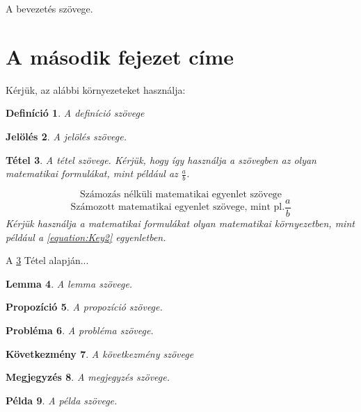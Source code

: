 \documentclass[a4paper,12pt]{article}
\newtheorem{theorem}{Tétel}[section]
\newtheorem{definition}[theorem]{Definíció}
\newtheorem{notation}[theorem]{Jelölés}
\newtheorem{lemma}[theorem]{Lemma}
\newtheorem{proposition}[theorem]{Propozíció}%
\newtheorem{problem}[theorem]{Probléma}%
\newtheorem{corollary}[theorem]{Következmény}%
\newtheorem{remark}[theorem]{Megjegyzés}%
\newtheorem{example}[theorem]{Példa}%
\begin{document}
A bevezetés szövege. 

\section{A második fejezet címe}

Kérjük, az alábbi környezeteket használja:

\begin{definition}
A definíció szövege
\end{definition}

\begin{notation}
A jelölés szövege.
\end{notation}

\begin{theorem}\label{theorem:Key1}
A tétel szövege. Kérjük, hogy így használja a szövegben az olyan matematikai formulákat, mint például az $\frac{a}{b}$. 
\par 
\[
\text{Számozás nélküli matematikai egyenlet szövege}
\]
\begin{equation}\label{equation:Key2}
\text{Számozott matematikai egyenlet szövege, mint pl.} \dfrac{a}{b}
\end{equation}
Kérjük használja a matematikai formulákat olyan matematikai környezetben, mint például a \ref{equation:Key2} egyenletben. 
\end{theorem}

\par A \ref{theorem:Key1} Tétel alapján...

\begin{lemma}
A lemma szövege.
\end{lemma}

\begin{proposition}
A propozíció szövege. 
\end{proposition}

\begin{problem}
A probléma szövege. 
\end{problem}

\begin{corollary}
A következmény szövege
\end{corollary}

\begin{remark}
A megjegyzés szövege. 
\end{remark}

\begin{example}
A példa szövege. 
\end{example}
\end{document}
